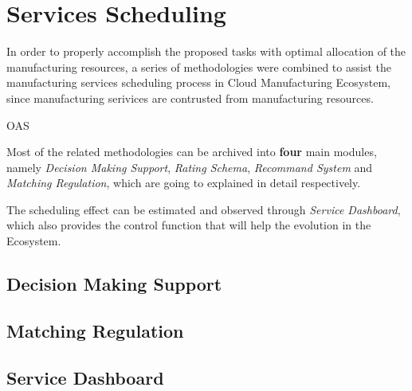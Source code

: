 \section{Services Scheduling} %
\label{sec:schedule}

In order to properly accomplish the proposed tasks with optimal allocation of the manufacturing resources, a series of methodologies were combined to assist the manufacturing services scheduling process in Cloud Manufacturing Ecosystem, since manufacturing serivices are contrusted from manufacturing resources. 

OAS  

Most of the related methodologies can be archived into \textbf{four} main modules, namely \textit{Decision Making Support}, \textit{Rating Schema}, \textit{Recommand System} and \textit{Matching Regulation}, which are going to explained in detail respectively.

The scheduling effect can be estimated and observed through \textit{Service Dashboard}, which also provides the control function that will help the evolution in the Ecosystem.

\subsection{Decision Making Support} %
\label{sub:decision_making_support}




\subsection{Matching Regulation} %
\label{sub:matching_regulation}


\subsection{Service Dashboard} %
\label{sub:service_dashboard}

